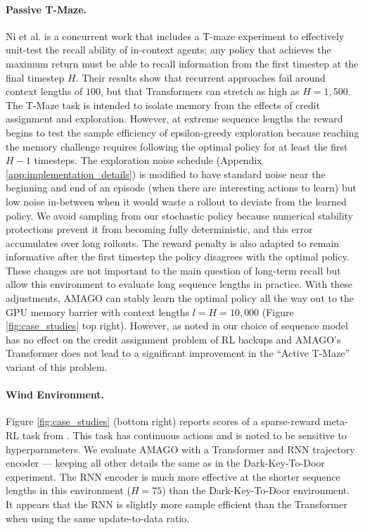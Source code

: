 \paragraph{Passive T-Maze.} Ni et al. \cite{ni2023transformers} is a concurrent work that includes a T-maze experiment to effectively unit-test the recall ability of in-context agents; any policy that achieves the maximum return must be able to recall information from the first timestep at the final timestep $H$. Their results show that recurrent approaches fail around context lengths of $100$, but that Transformers can stretch as high as $H = 1,500$. The T-Maze task is intended to isolate memory from the effects of credit assignment and exploration. However, at extreme sequence lengths the reward begins to test the sample efficiency of epsilon-greedy exploration because reaching the memory challenge requires following the optimal policy for at least the first $H - 1$ timesteps. The exploration noise schedule (Appendix \ref{app:implementation_details}) is modified to have standard noise near the beginning and end of an episode (when there are interesting actions to learn) but low noise in-between when it would waste a rollout to deviate from the learned policy. We avoid sampling from our stochastic policy because numerical stability protections prevent it from becoming fully deterministic, and this error accumulates over long rollouts. The reward penalty is also adapted to remain informative after the first timestep the policy disagrees with the optimal policy. These changes are not important to the main question of long-term recall but allow this environment to evaluate long sequence lengths in practice. With these adjustments, AMAGO can stably learn the optimal policy all the way out to the GPU memory barrier with context lengths $l = H = 10,000$ (Figure \ref{fig:case_studies} top right). However, as noted in \cite{ni2023transformers} our choice of sequence model has no effect on the credit assignment problem of RL backups and AMAGO's Transformer does not lead to a significant improvement in the ``Active T-Maze'' variant of this problem.

\paragraph{Wind Environment.} Figure \ref{fig:case_studies} (bottom right) reports scores of a sparse-reward meta-RL task from \cite{ni2022recurrent}. This task has continuous actions and is noted to be sensitive to hyperparameters. We evaluate AMAGO with a Transformer and RNN trajectory encoder --- keeping all other details the same as in the Dark-Key-To-Door experiment. The RNN encoder is much more effective at the shorter sequence lengths in this environment ($H = 75$) than the Dark-Key-To-Door environment. It appears that the RNN is slightly more sample efficient than the Transformer when using the same update-to-data ratio.

